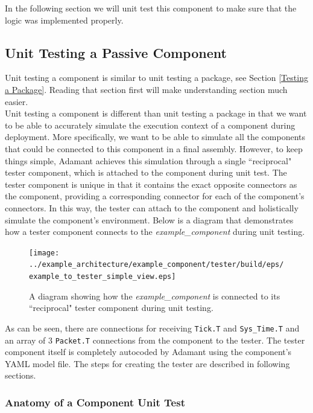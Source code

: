 In the following section we will unit test this component to make sure that the logic was implemented properly.

\subsection{Unit Testing a Passive Component} \label{Component Unit Testing}

Unit testing a component is similar to unit testing a package, see Section \ref{Testing a Package}. Reading that section first will make understanding section much easier. \\

Unit testing a component is different than unit testing a package in that we want to be able to accurately simulate the execution context of a component during deployment. More specifically, we want to be able to simulate all the components that could be connected to this component in a final assembly. However, to keep things simple, Adamant achieves this simulation through a single ``reciprocal" tester component, which is attached to the component during unit test. The tester component is unique in that it contains the exact opposite connectors as the component, providing a corresponding connector for each of the component's connectors. In this way, the tester can attach to the component and holistically simulate the component's environment. Below is a diagram that demonstrates how a tester component connects to the \textit{example\_component} during unit testing.

\begin{figure}[H]
  \texttt{[image: ../example\_architecture/example\_component/tester/build/eps/example\_to\_tester\_simple\_view.eps]}
  \caption{A diagram showing how the \textit{example\_component} is connected to its ``reciprocal" tester component during unit testing.}
\end{figure}

As can be seen, there are connections for receiving \texttt{Tick.T} and \texttt{Sys\_Time.T} and an array of 3 \texttt{Packet.T} connections from the component to the tester. The tester component itself is completely autocoded by Adamant using the component's YAML model file. The steps for creating the tester are described in following sections. \\

\subsubsection{Anatomy of a Component Unit Test} \label{Anatomy of a Component Unit Test}

